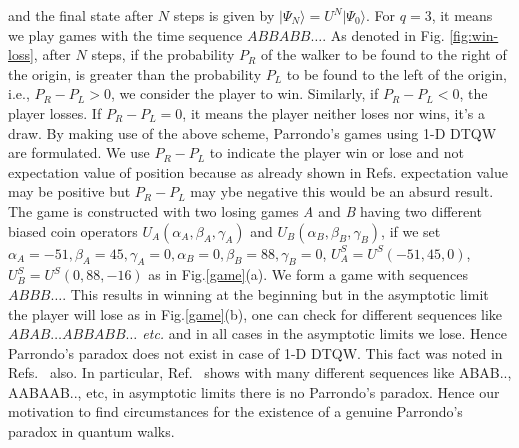 \documentclass[english,aps,pra,amsmath,amssymb,showpacs,notitlepage,onecolumn]{revtex4-1}
\begin{document}
and the final state after $N$ steps is given by $\vert\Psi_{N}\rangle=U^{N}\vert\Psi_{0}\rangle$. For $q=3$, it means we play games with the time sequence $ABBABB\ldots$. As denoted in Fig. \ref{fig:win-loss}, after $N$ steps, if the probability $P_{R}$ of the walker to be found to the right of the origin, is greater than the probability $P_{L}$ to be found to the left of the origin, i.e., $P_{R}-P_{L}>0$, we consider the player to win. Similarly, if $P_{R}-P_{L}<0$, the player losses. If $P_{R}-P_{L}=0$, it means the player neither loses nor wins, it's a draw. By making use of the above scheme, Parrondo's games using 1-D DTQW are formulated. We use $P_R-P_L$ to indicate the player win or lose and not expectation value of position because as already shown in Refs.\cite{minli} expectation value may be positive but $P_R-P_L$ may ybe negative this would be an absurd result. The game is constructed with two losing games \emph{A} and \emph{B} having two different biased coin operators $U_{A} (\alpha_{A},\beta_{A},\gamma_{A})$ and $U_{B}(\alpha_{B},\beta_{B},\gamma_{B})$, if we set $\alpha_A=-51,\beta_{A}=45,\gamma_{A}=0,\alpha_{B}=0,\beta_{B}=88,\gamma_B=0$,  $U_{A}^{S}=U^{S}(-51,45,0)$, $U_{B}^{S}=U^{S}(0,88,-16)$ as in Fig.\ref{game}(a). We form a game with sequences \emph{$ABBB\ldots$}. This results in winning at the beginning but in the asymptotic limit the player will lose as in Fig.\ref{game}(b), one can check for different sequences like \emph{$ABAB\ldots ABBABB\ldots$ etc.} and in all cases in the asymptotic limits we lose. Hence Parrondo's paradox does not exist in case of 1-D DTQW. This fact was noted in Refs.~\cite{flitney,minli} also. In particular, Ref.~\cite{flitney} shows with many different sequences like ABAB.., AABAAB.., etc, in asymptotic limits there is no Parrondo's paradox. Hence our motivation to find circumstances for the existence of a genuine Parrondo's paradox in quantum walks. 
\end{document}
